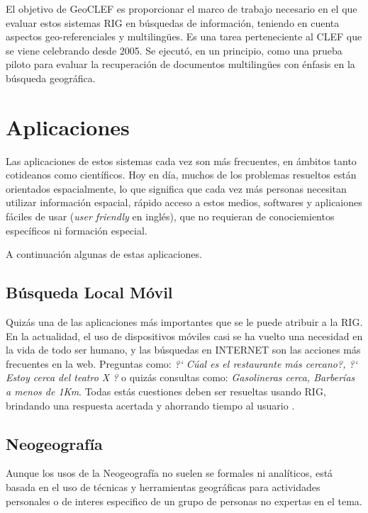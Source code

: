 \documentclass{llncs}
\begin{document}
El objetivo de GeoCLEF es proporcionar el marco de trabajo necesario en el que
evaluar estos sistemas RIG en búsquedas de información, teniendo en cuenta
aspectos geo-referenciales y multiling\"ues. Es una tarea perteneciente al CLEF
que se viene celebrando desde 2005. Se ejecutó, en un principio, como una
prueba piloto para evaluar la recuperación de documentos multiling\"ues con
énfasis en la búsqueda geográfica.


\section{Aplicaciones}\label{sec:appl}

Las aplicaciones de estos sistemas cada vez son más frecuentes, en ámbitos
tanto cotideanos como científicos. Hoy en día, muchos de los problemas
resueltos están orientados espacialmente, lo que significa que cada vez más
personas necesitan utilizar información espacial, rápido acceso a estos medios,
softwares y aplicaiones fáciles de usar (\emph{user friendly} en inglés), que no
requieran de conociemientos específicos ni formación especial.

A continuación algunas de estas aplicaciones.

\subsection{Búsqueda Local Móvil}\label{sec:mobile}

Quizás una de las aplicaciones más importantes que se le puede atribuir a la
RIG. En la actualidad, el uso de dispositivos móviles casi se ha vuelto una
necesidad en la vida de todo ser humano, y las búsquedas en INTERNET son las
acciones más frecuentes en la web. Preguntas como: \emph{?` Cúal es el
restaurante más cercano?, ?` Estoy cerca del teatro X ?} o quizás consultas
como: \emph{Gasolineras cerca, Barberías a menos de 1Km}. Todas estás
cuestiones deben ser resueltas usando RIG, brindando una respuesta acertada y
ahorrando tiempo al usuario \cite{teevan2011,lymberopoulos2011}. 

\subsection{Neogeografía}\label{sec:neogeo}

Aunque los usos de la Neogeografía no suelen se formales ni analíticos, está
basada en el uso de técnicas y herramientas geográficas para actividades
personales o de interes especifico de un grupo de personas no expertas en el
tema.\cite{turner2006}
\end{document}
